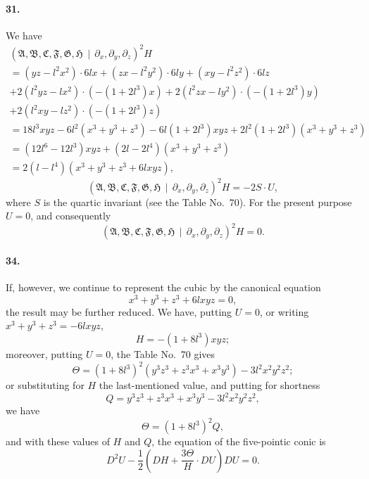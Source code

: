\documentclass[12pt,a4paper]{article}
\theoremstyle{plain}
\begin{document}
\paragraph{31.}
We  have
\begin{multline*}
(\mathfrak{A}, \mathfrak{B}, \mathfrak{C}, \mathfrak{F}, \mathfrak{G}, \mathfrak{H} \,\!\!\mid\, \partial_x, \partial_y, \partial_z)^2 H \\
= (yz - l^2x^2) \cdot 6lx + (zx - l^2y^2) \cdot 6ly + (xy - l^2z^2) \cdot 6lz \\
+ 2(l^2yz - lx^2) \cdot (-(1 + 2l^3)x) + 2(l^2zx - ly^2) \cdot (-(1 + 2l^3)y) \\
+ 2(l^2xy - lz^2) \cdot (-(1 + 2l^3)z) \\
= 18l^3 xyz - 6l^2(x^3 + y^3 + z^3) - 6l(1 + 2l^3)xyz + 2l^2(1 + 2l^3)(x^3 + y^3 + z^3) \\
= (12l^6 - 12l^3)xyz + (2l - 2l^4)(x^3 + y^3 + z^3) \\
= 2(l - l^4)(x^3 + y^3 + z^3 + 6lxyz),
\end{multline*}
\[
(\mathfrak{A}, \mathfrak{B}, \mathfrak{C}, \mathfrak{F}, \mathfrak{G}, \mathfrak{H} \,\!\!\mid\, \partial_x, \partial_y, \partial_z)^2 H = -2S \cdot U,
\]
where   $S$  is  the  quartic  invariant  (see  the  Table  No.~70).     For  the  present  purpose  $U = 0$,
and  consequently
\[
(\mathfrak{A}, \mathfrak{B}, \mathfrak{C}, \mathfrak{F}, \mathfrak{G}, \mathfrak{H} \,\!\!\mid\, \partial_x, \partial_y, \partial_z)^2 H = 0.
\]


\newpage
\paragraph{34.}
If,  however,  we  continue  to  represent  the  cubic  by  the  canonical  equation
\[
x^3 + y^3 + z^3 + 6lxyz = 0,
\]
the  result  may  be  further  reduced.     We  have,  putting  $U = 0$,  or  writing  $x^3 + y^3 + z^3 = -6lxyz$,
\[
H = -(1 + 8l^3) xyz;
\]
moreover,  putting  $U = 0$,  the  Table  No.~70  gives
\[
\Theta = (1 + 8l^3)^2 (y^3 z^3 + z^3 x^3 + x^3 y^3) - 3l^2 x^2 y^2 z^2;
\]
or  substituting  for  $H$  the  last-mentioned  value,  and  putting  for  shortness
\[
Q = y^3 z^3 + z^3 x^3 + x^3 y^3 - 3l^2 x^2 y^2 z^2,
\]
we  have
\[
\Theta = (1 + 8l^3)^2 Q,
\]
and  with  these  values  of  $H$  and  $Q$,  the  equation  of  the  five-pointic  conic  is
\[
D^2 U - \frac{1}{2} \left(DH + \frac{3\Theta}{H} \cdot DU\right) DU = 0.
\]
\end{document}
